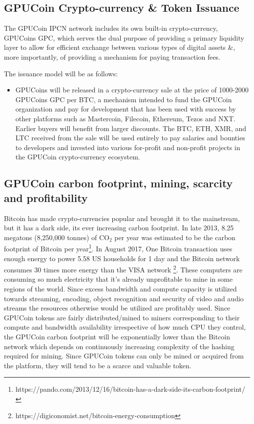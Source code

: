 \documentclass{article}
\begin{document}
\subsection{GPUCoin Crypto-currency \& Token Issuance}

The GPUCoin IPCN network includes its own built-in crypto-currency, GPUCoins GPC, which serves the dual purpose of providing a primary liquidity layer to allow for efficient exchange between various types of digital assets \&, more importantly, of providing a mechanism for paying transaction fees.

The issuance model will be as follows:

\begin{itemize}

\item GPUCoins will be released in a crypto-currency sale at the price of 1000-2000 GPUCoins GPC per BTC,
 a mechanism intended to fund the GPUCoin organization and pay for development that has been used with success by other platforms such as Mastercoin, Filecoin, Ethereum, Tezos and NXT.
Earlier buyers will benefit from larger discounts. The BTC, ETH, XMR, and LTC received from the sale will be used entirely to pay salaries and bounties to developers and invested into various for-profit and non-profit projects in the GPUCoin crypto-currency ecosystem.

\end{itemize}

\subsection{GPUCoin carbon footprint, mining, scarcity and profitability}
Bitcoin has made crypto-currencies popular and brought it to the mainstream, but it has a dark side, its ever increasing carbon footprint. In late 2013, 8.25 megatons (8,250,000 tonnes) of CO$_2$ per year was estimated to be the carbon footprint of Bitcoin per year\footnote{https://pando.com/2013/12/16/bitcoin-has-a-dark-side-its-carbon-footprint/}. In August 2017, One Bitcoin transaction uses enough energy to power 5.58 US households for 1 day and the Bitcoin network consumes 30 times more energy than the VISA network \footnote{https://digiconomist.net/bitcoin-energy-consumption}. These computers are consuming so much electricity that it’s already unprofitable to mine in some regions of the world. Since excess bandwidth and compute capacity is utilized towards streaming, encoding, object recognition and security of video and audio streams the resources otherwise would be utilized are profitably used. Since GPUCoin tokens are fairly distributed/mined to miners corresponding to their compute and bandwidth availability irrespective of how much CPU they control, the GPUCoin carbon footprint will be exponentially lower than the Bitcoin network which depends on continuously increasing complexity of the hashing required for mining. Since GPUCoin tokens can only be mined or acquired from the platform, they will tend to be a scarce and valuable token.
\end{document}
